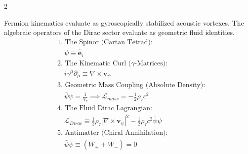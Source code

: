 \documentclass[11pt, a4paper]{article}
\newcounter{cheatnum}
\begin{document}
\begin{multicols}{2}
\begin{tcolorbox}[cheatbox, title={\refstepcounter{cheatnum}\label{box:dirac_isomorphism}\thecheatnum. Vorticity Equilibrium (The Dirac Equation) \scriptsize\hfill\hyperref[sec:deriv_dirac_isomorphism]{[Proof $\downarrow$]}}]
Fermion kinematics evaluate as gyroscopically stabilized acoustic vortexes. The algebraic operators of the Dirac sector evaluate as geometric fluid identities.
\begin{align}
    &\text{1. The Spinor (Cartan Tetrad):} \nonumber \\
    &\quad \psi \equiv \mathbf{\hat{e}}_i \label{eq:spinor_identity} \\
    &\text{2. The Kinematic Curl ($\gamma$-Matrices):} \nonumber \\
    &\quad i\gamma^\mu \partial_\mu \equiv \nabla \times \mathbf{v}_\psi \label{eq:gamma_curl} \\
    &\text{3. Geometric Mass Coupling (Absolute Density):} \nonumber \\
    &\quad \bar{\psi} \psi = \frac{1}{V_{\tau}} \implies \mathcal{L}_{mass} = - \frac{1}{2} \rho_{\tau} c^2 \label{eq:absolute_mass_lagrangian} \\
    &\text{4. The Fluid Dirac Lagrangian:} \nonumber \\
    &\quad \mathcal{L}_{Dirac} \equiv \frac{1}{2}\rho_{\tau} |\nabla \times \mathbf{v}_\psi|^2 - \frac{1}{2} \rho_{\tau} c^2 \bar{\psi}\psi \label{eq:dirac_fluid_lagrangian} \\
    &\text{5. Antimatter (Chiral Annihilation):} \nonumber \\
    &\quad \bar{\psi}\psi \equiv (W_+ + W_-) = 0 \label{eq:chiral_annihilate}
\end{align}
\end{tcolorbox}


\end{multicols}
\end{document}
